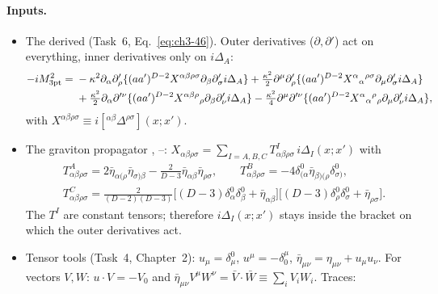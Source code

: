 \paragraph{Inputs.}
\begin{itemize}[leftmargin=30pt,labelsep=5pt]
\item[(G1)] The derived  \tD{} (Task~6, Eq.~\eqref{eq:ch3-46}). Outer derivatives ($\partial,\partial'$) act on everything, inner derivatives only on $i\Delta_A$:
\begin{equation}
\begin{aligned}
-iM^2_{\rm 3pt}={}&-\kappa^2\partial_\alpha\partial'_\rho\{(aa')^{D-2}X^{\alpha\beta\rho\sigma}\partial_\beta\partial'_\sigma i\Delta_A\}
+\tfrac{\kappa^2}2\partial^\mu\partial'_\rho\{(aa')^{D-2}X^\alpha{}_\alpha{}^{\rho\sigma}\partial_\mu\partial'_\sigma i\Delta_A\}\\
&+\tfrac{\kappa^2}2\partial_\alpha\partial'^\nu\{(aa')^{D-2}X^{\alpha\beta\rho}{}_\rho\partial_\beta\partial'_\nu i\Delta_A\}
-\tfrac{\kappa^2}4\partial^\mu\partial'^\nu\{(aa')^{D-2}X^\alpha{}_\alpha{}^\rho{}_\rho\partial_\mu\partial'_\nu i\Delta_A\},
\end{aligned}
\label{eq:ch3-t7G1}
\end{equation}
with $X^{\alpha\beta\rho\sigma}\equiv i[{}^{\alpha\beta}\Delta^{\rho\sigma}](x;x')$.
\item[(G2)] The graviton propagator \tP, --: $X_{\alpha\beta\rho\sigma}=\sum_{I=A,B,C}T^I_{\alpha\beta\rho\sigma}\,i\Delta_I(x;x')$ with
\begin{equation}
\begin{aligned}
&T^A_{\alpha\beta\rho\sigma}=2\bar\eta_{\alpha(\rho}\bar\eta_{\sigma)\beta}-\tfrac{2}{D-3}\bar\eta_{\alpha\beta}\bar\eta_{\rho\sigma},\qquad
T^B_{\alpha\beta\rho\sigma}=-4\delta^0_{(\alpha}\bar\eta_{\beta)(\rho}\delta^0_{\sigma)},\\
&T^C_{\alpha\beta\rho\sigma}=\tfrac{2}{(D-2)(D-3)}\big[(D-3)\delta^0_\alpha\delta^0_\beta+\bar\eta_{\alpha\beta}\big]\big[(D-3)\delta^0_\rho\delta^0_\sigma+\bar\eta_{\rho\sigma}\big].
\end{aligned}
\label{eq:ch3-T}
\end{equation}
The $T^I$ are constant tensors; therefore $i\Delta_I(x;x')$ stays inside the bracket on which the outer derivatives act.
\item[(G3)] Tensor tools \tD{} (Task~4, Chapter~2): $u_\mu=\delta^0_\mu$, $u^\mu=-\delta^\mu_0$, $\bar\eta_{\mu\nu}=\eta_{\mu\nu}+u_\mu u_\nu$.
For vectors $V,W$: $u\cdot V=-V_0$ and $\bar\eta_{\mu\nu}V^\mu W^\nu=\bar V\!\cdot\!\bar W\equiv\sum_iV_iW_i$. Traces:

\end{itemize}

